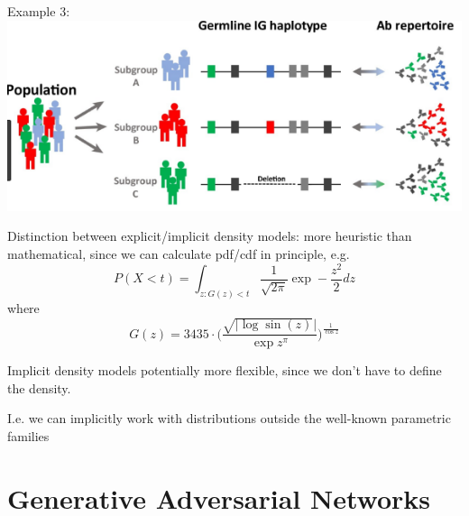 \documentclass{beamer}
\let\tempone\itemize
\let\temptwo\enditemize
\renewenvironment{itemize}{\tempone\addtolength{\itemsep}{0.5\baselineskip}}{\temptwo}
\begin{document}
\begin{frame}
\begin{center}
\end{center}
\begin{itemize}
\item Example 3:
\end{itemize}
\center
\includegraphics[scale=0.45]{abc}
\end{frame}


\begin{frame}
\begin{center}
\end{center}
\center
\begin{itemize}
\item Distinction between explicit/implicit density models: more heuristic than mathematical, since we can calculate pdf/cdf in principle, e.g. 
\[ P(X < t) = \int_{z : G(z) < t} \frac{1}{\sqrt{2\pi}}\exp -\frac{z^2}{2} dz \]
where \[G(z) =  3435\cdot \Big(\frac{\sqrt{|\log \sin (z)}|}{\exp z^{\pi}}\Big)^{\frac{1}{\cos z}}\] \pause
\item  Implicit density models potentially more flexible, since we don't have to define the density. \pause
\item I.e. we can implicitly work with distributions outside the well-known parametric families
\end{itemize}

\end{frame}



\section{Generative Adversarial Networks}
\end{document}
